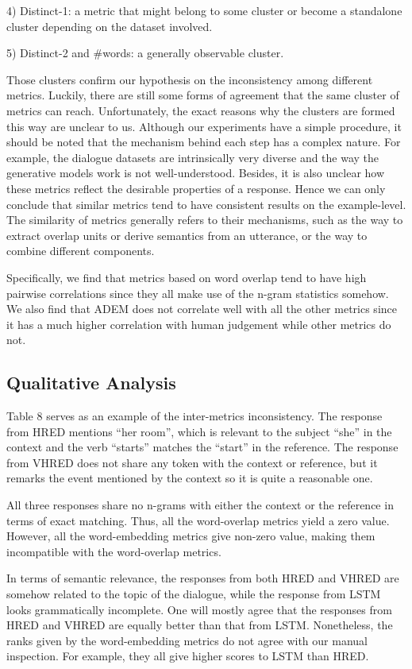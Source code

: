 \documentclass[conference]{IEEEtran}
\begin{document}
4) Distinct-1: a metric that might belong to some cluster or become a standalone cluster depending on the dataset involved.

5) Distinct-2 and \#words: a generally observable cluster.

Those clusters confirm our hypothesis on the inconsistency among different metrics.
Luckily, there are still some forms of agreement that the same cluster of metrics can reach.
Unfortunately, the exact reasons why the clusters are formed this way are unclear to us.
Although our experiments have a simple procedure, it should be noted that the mechanism behind each step has a complex nature.
For example, the dialogue datasets are intrinsically very diverse and the way the generative models work is not well-understood.
Besides, it is also unclear how these metrics reflect the desirable properties of a response.
Hence we can only conclude that similar metrics tend to have consistent results on the example-level.
The similarity of metrics generally refers to their mechanisms, such as the way to extract overlap units or derive semantics from an utterance, or the way to combine different components.

Specifically, we find that metrics based on word overlap tend to have high pairwise correlations since they all make use of the n-gram statistics somehow.
We also find that ADEM does not correlate well with all the other metrics since it has a much higher correlation with human judgement while other metrics do not.

\subsection{Qualitative Analysis}

Table 8 serves as an example of the inter-metrics inconsistency.
The response from HRED mentions ``her room'', which is relevant to the subject ``she'' in the context and the verb ``starts'' matches the ``start'' in the reference.
The response from VHRED does not share any token with the context or reference, but it remarks the event mentioned by the context so it is quite a reasonable one.

All three responses share no n-grams with either the context or the reference in terms of exact matching.
Thus, all the word-overlap metrics yield a zero value.
However, all the word-embedding metrics give non-zero value, making them incompatible with the word-overlap metrics.

In terms of semantic relevance, the responses from both HRED and VHRED are somehow related to the topic of the dialogue, while the response from LSTM looks grammatically incomplete.
One will mostly agree that the responses from HRED and VHRED are equally better than that from LSTM. Nonetheless, the ranks given by the word-embedding metrics do not agree with our manual inspection.
For example, they all give higher scores to LSTM than HRED.
\end{document}
